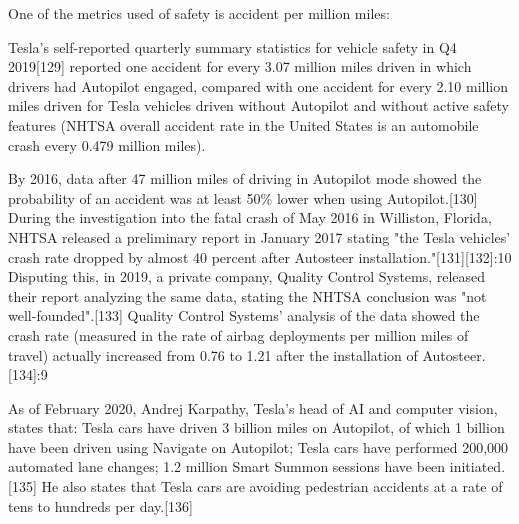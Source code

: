One of the metrics used of safety is accident per million miles:

Tesla's self-reported quarterly summary statistics for vehicle safety in Q4 2019[129] reported one accident for every 3.07 million miles driven in which drivers had Autopilot engaged, compared with one accident for every 2.10 million miles driven for Tesla vehicles driven without Autopilot and without active safety features (NHTSA overall accident rate in the United States is an automobile crash every 0.479 million miles).

By 2016, data after 47 million miles of driving in Autopilot mode showed the probability of an accident was at least 50\% lower when using Autopilot.[130] During the investigation into the fatal crash of May 2016 in Williston, Florida, NHTSA released a preliminary report in January 2017 stating "the Tesla vehicles' crash rate dropped by almost 40 percent after Autosteer installation."[131][132]:10 Disputing this, in 2019, a private company, Quality Control Systems, released their report analyzing the same data, stating the NHTSA conclusion was "not well-founded".[133] Quality Control Systems' analysis of the data showed the crash rate (measured in the rate of airbag deployments per million miles of travel) actually increased from 0.76 to 1.21 after the installation of Autosteer.[134]:9

As of February 2020, Andrej Karpathy, Tesla’s head of AI and computer vision, states that: Tesla cars have driven 3 billion miles on Autopilot, of which 1 billion have been driven using Navigate on Autopilot; Tesla cars have performed 200,000 automated lane changes; 1.2 million Smart Summon sessions have been initiated.[135] He also states that Tesla cars are avoiding pedestrian accidents at a rate of tens to hundreds per day.[136]